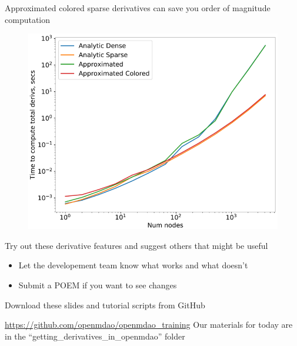 \documentclass[aspectratio=169, usenames, dvipsnames, 14pt]{beamer}
\begin{document}
\begin{frame}{Approximated colored sparse derivatives can save you order of magnitude computation}

	\begin{figure}
		\includegraphics[scale=.41]{images/slide_60_derivatives.png}
	\end{figure}

\end{frame}

\begin{frame}{Try out these derivative features and suggest others that might be useful}

	\begin{itemize}
		\item Let the developement team know what works and what doesn't
		\item Submit a POEM if you want to see changes
	\end{itemize}

\end{frame}

\begingroup
{}
\begin{frame}[plain]{}

\end{frame}
\endgroup

\begin{frame}{Download these slides and tutorial scripts from GitHub}

	\url{https://github.com/openmdao/openmdao_training}
	\newline \newline Our materials for today are in the ``getting\_derivatives\_in\_openmdao'' folder
	
\end{frame}                        
\end{document}
